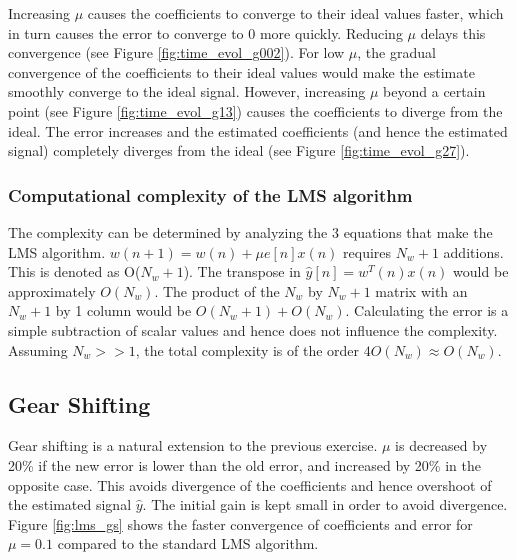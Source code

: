 \documentclass{article}
\begin{document}
\pagebreak

Increasing $\mu$ causes the coefficients to converge to their ideal values faster, which in turn causes the error to converge to 0 more quickly. Reducing $\mu$ delays this convergence (see Figure \ref{fig:time_evol_g002}). For low $\mu$, the gradual convergence of the coefficients to their ideal values would make the estimate smoothly converge to the ideal signal. However, increasing $\mu$ beyond a certain point (see Figure \ref{fig:time_evol_g13}) causes the coefficients to diverge from the ideal. The error increases and the estimated coefficients (and hence the estimated signal) completely diverges from the ideal (see Figure \ref{fig:time_evol_g27}).


\subsubsection{Computational complexity of the LMS algorithm}

The complexity can be determined by analyzing the 3 equations that make the LMS algorithm. $w(n+1)=w(n)+\mu e[n]x(n)$ requires $N_w+1$ additions. This is denoted as O($N_w+1$). The transpose in $\hat{y}[n]=w^T(n)x(n)$ would be approximately $O(N_w)$. The product of the $N_w$ by $N_w+1$ matrix with an $N_w+1$ by 1 column would be $O(N_w+1) + O(N_w)$. Calculating the error is a simple subtraction of scalar values and hence does not influence the complexity. Assuming $N_w>>1$, the total complexity is of the order $4O(N_w) \approx O(N_w)$.


\subsection{Gear Shifting}

Gear shifting is a natural extension to the previous exercise. $\mu$ is decreased by 20\% if the new error is lower than the old error, and increased by 20\% in the opposite case. This avoids divergence of the coefficients and hence overshoot of the estimated signal $\hat{y}$. The initial gain is kept small in order to avoid divergence. Figure \ref{fig:lms_gs} shows the faster convergence of coefficients and error for $\mu=0.1$ compared to the standard LMS algorithm.
\end{document}
